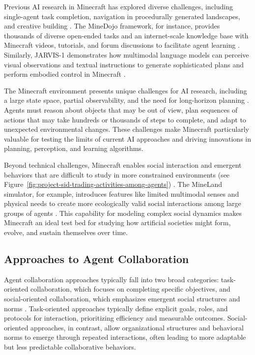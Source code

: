 \documentclass[a4paper, 12pt]{article}
\begin{document}
Previous AI research in Minecraft has explored diverse challenges, including single-agent task completion, navigation in procedurally generated landscapes, and creative building \autocite{Zhao2024, Wang2025}. The MineDojo framework, for instance, provides thousands of diverse open-ended tasks and an internet-scale knowledge base with Minecraft videos, tutorials, and forum discussions to facilitate agent learning \autocite{Fan2022}. Similarly, JARVIS-1 demonstrates how multimodal language models can perceive visual observations and textual instructions to generate sophisticated plans and perform embodied control in Minecraft \autocite{Wang2025}.

The Minecraft environment presents unique challenges for AI research, including a large state space, partial observability, and the need for long-horizon planning \autocite{Fan2022, Wang2025}. Agents must reason about objects that may be out of view, plan sequences of actions that may take hundreds or thousands of steps to complete, and adapt to unexpected environmental changes. These challenges make Minecraft particularly valuable for testing the limits of current AI approaches and driving innovations in planning, perception, and learning algorithms.

Beyond technical challenges, Minecraft enables social interaction and emergent behaviors that are difficult to study in more constrained environments (see Figure~\ref{fig:project-sid-trading-activities-among-agents}) \autocite{Altera2024}. The MineLand simulator, for example, introduces features like limited multimodal senses and physical needs to create more ecologically valid social interactions among large groups of agents \autocite{Yu2024}. This capability for modeling complex social dynamics makes Minecraft an ideal test bed for studying how artificial societies might form, evolve, and sustain themselves over time.

\subsection{Approaches to Agent Collaboration}

Agent collaboration approaches typically fall into two broad categories: task-oriented collaboration, which focuses on completing specific objectives, and social-oriented collaboration, which emphasizes emergent social structures and norms \autocite{Shu2024, Qiu2024}. Task-oriented approaches typically define explicit goals, roles, and protocols for interaction, prioritizing efficiency and measurable outcomes. Social-oriented approaches, in contrast, allow organizational structures and behavioral norms to emerge through repeated interactions, often leading to more adaptable but less predictable collaborative behaviors.
\end{document}
